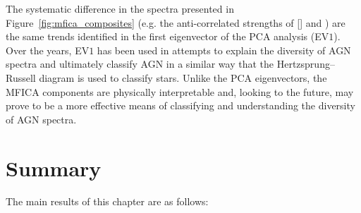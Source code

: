 The systematic difference in the spectra presented in Figure~\ref{fig:mfica_composites} (e.g. the anti-correlated strengths of [] and ) are the same trends identified in the first eigenvector of the \citet{boroson92} PCA analysis (EV$1$). 
Over the years, EV$1$ has been used in attempts to explain the diversity of AGN spectra and ultimately classify AGN in a similar way that the Hertzsprung–Russell diagram is used to classify stars.
Unlike the PCA eigenvectors, the MFICA components are physically interpretable and, looking to the future, may prove to be a more effective means of classifying and understanding the diversity of AGN spectra. 

\section{Summary}

The main results of this chapter are as follows: 

